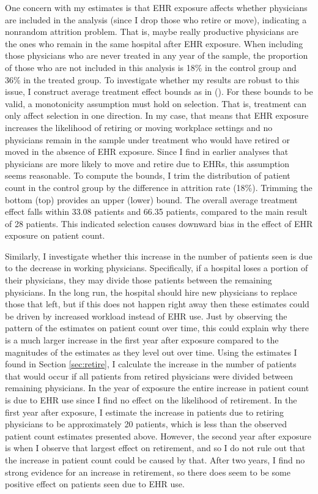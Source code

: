 \documentclass[12pt]{article}
\begin{document}
One concern with my estimates is that EHR exposure affects whether physicians are included in the analysis (since I drop those who retire or move), indicating a nonrandom attrition problem. That is, maybe really productive physicians are the ones who remain in the same hospital after EHR exposure. When including those physicians who are never treated in any year of the sample, the proportion of those who are not included in this analysis is 18\% in the control group and 36\% in the treated group. To investigate whether my results are robust to this issue, I construct average treatment effect bounds as in  \citeauthor{lee2009training} (\citeyear{lee2009training}). For these bounds to be valid, a monotonicity assumption must hold on selection. That is, treatment can only affect selection in one direction. In my case, that means that EHR exposure increases the likelihood of retiring or moving workplace settings and no physicians remain in the sample under treatment who would have retired or moved in the absence of EHR exposure. Since I find in earlier analyses that physicians are more likely to move and retire due to EHRs, this assumption seems reasonable. To compute the bounds, I trim the distribution of patient count in the control group by the difference in attrition rate (18\%). Trimming the bottom (top) provides an upper (lower) bound. The overall average treatment effect falls within 33.08 patients and 66.35 patients, compared to the main result of 28 patients. This indicated selection causes downward bias in the effect of EHR exposure on patient count.  

Similarly, I investigate whether this increase in the number of patients seen is due to the decrease in working physicians. Specifically, if a hospital loses a portion of their physicians, they may divide those patients between the remaining physicians. In the long run, the hospital should hire new physicians to replace those that left, but if this does not happen right away then these estimates could be driven by increased workload instead of EHR use. Just by observing the pattern of the estimates on patient count over time, this could explain why there is a much larger increase in the first year after exposure compared to the magnitudes of the estimates as they level out over time. Using the estimates I found in Section \ref{sec:retire}, I calculate the increase in the number of patients that would occur if all patients from retired physicians were divided between remaining physicians. In the year of exposure the entire increase in patient count is due to EHR use since I find no effect on the likelihood of retirement. In the first year after exposure, I estimate the increase in patients due to retiring physicians to be approximately 20 patients, which is less than the observed patient count estimates presented above. However, the second year after exposure is when I observe that largest effect on retirement, and so I do not rule out that the increase in patient count could be caused by that. After two years, I find no strong evidence for an increase in retirement, so there does seem to be some positive effect on patients seen due to EHR use. 
\end{document}
